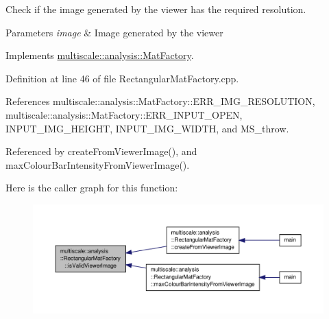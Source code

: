 Check if the image generated by the viewer has the required resolution. 


\begin{DoxyParams}{Parameters}
{\em image} & Image generated by the viewer \\
\hline
\end{DoxyParams}


Implements \hyperlink{classmultiscale_1_1analysis_1_1MatFactory_ad6acdd120b128eb9fb502fca23a7de69}{multiscale\-::analysis\-::\-Mat\-Factory}.



Definition at line 46 of file Rectangular\-Mat\-Factory.\-cpp.



References multiscale\-::analysis\-::\-Mat\-Factory\-::\-E\-R\-R\-\_\-\-I\-M\-G\-\_\-\-R\-E\-S\-O\-L\-U\-T\-I\-O\-N, multiscale\-::analysis\-::\-Mat\-Factory\-::\-E\-R\-R\-\_\-\-I\-N\-P\-U\-T\-\_\-\-O\-P\-E\-N, I\-N\-P\-U\-T\-\_\-\-I\-M\-G\-\_\-\-H\-E\-I\-G\-H\-T, I\-N\-P\-U\-T\-\_\-\-I\-M\-G\-\_\-\-W\-I\-D\-T\-H, and M\-S\-\_\-throw.



Referenced by create\-From\-Viewer\-Image(), and max\-Colour\-Bar\-Intensity\-From\-Viewer\-Image().



Here is the caller graph for this function\-:\nopagebreak
\begin{figure}[H]
\begin{center}
\leavevmode
\includegraphics[width=350pt]{classmultiscale_1_1analysis_1_1RectangularMatFactory_a398913bbfa8ca9d80cb630c29a37a135_icgraph}
\end{center}
\end{figure}


